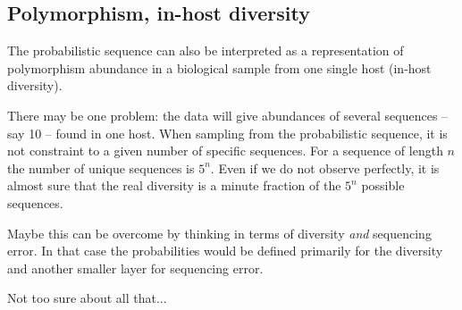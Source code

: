 \documentclass[12pt]{article}
\begin{document}
\subsection{Polymorphism, in-host diversity}

The probabilistic sequence can also be interpreted as a representation of polymorphism abundance in a biological sample from one single host (in-host diversity).

There may be one problem: the data will give abundances of several sequences -- say 10 -- found in one host. 
When sampling from the probabilistic sequence, it is not constraint to a given number of specific sequences. For a sequence of length $n$ the number of  unique sequences is $5^n$. Even if we do not observe perfectly, it is almost sure that the real diversity is a minute fraction of the $5^n$ possible sequences.
 
Maybe this can be overcome by thinking in terms of diversity \emph{and} sequencing error.
In that case the probabilities would be defined primarily for the diversity and another smaller layer for sequencing error. 

Not too sure about all that... 
\end{document}
